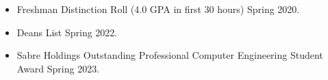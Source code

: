 \begin{itemize}
    \itemindent=-16pt
    \item Freshman Distinction Roll (4.0 GPA in first 30 hours) Spring 2020.
    \item Dean\textquotesingle{}s List Spring 2022.
    \item Sabre Holdings\textquotesingle{} Outstanding Professional Computer Engineering Student Award Spring 2023.
\end{itemize}